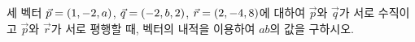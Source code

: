 세 벡터 $\vec{p}=(1{,}\mkern3mu\mathopen{}-2{,}\mkern3mu\mathopen{}a)$, $\vec{q}=(-2{,}\mkern3mu\mathopen{}b{,}\mkern3mu\mathopen{}2)$, $\vec{r}=(2{,}\mkern3mu\mathopen{}-4{,}\mkern3mu\mathopen{}8)$에 대하여 $\vec{p}$와 $\vec{q}$가 서로 수직이고 $\vec{p}$와 $\vec{r}$가 서로 평행할 때, 벡터의 내적을 이용하여 $ab$의 값을 구하시오.
